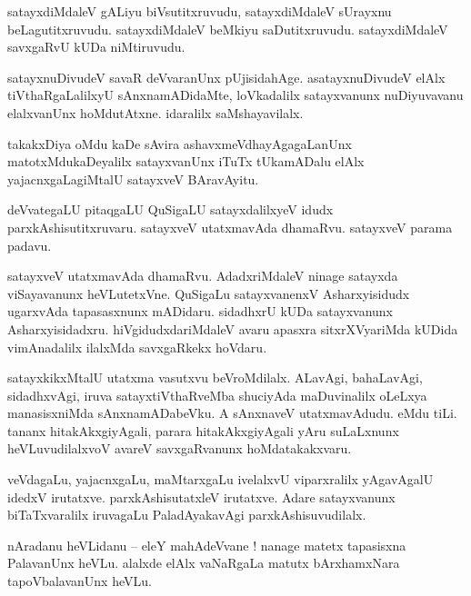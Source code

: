 \documentclass{article}
\begin{document}
\begin{mn}%
satayxdiMdaleV gALiyu biVsutitxruvudu, satayxdiMdaleV sUrayxnu beLagutitxruvudu. satayxdiMdaleV 
beMkiyu saDutitxruvudu. satayxdiMdaleV savxgaRvU kUDa niMtiruvudu.
\end{mn}

\begin{mn}%
satayxnuDivudeV savaR deVvaranUnx pUjisidahAge. asatayxnuDivudeV elAlx tiVthaRgaLalilxyU 
sAnxnamADidaMte, loVkadalilx satayxvanunx nuDiyuvavanu elalxvanUnx hoMdutAtxne. idaralilx 
saMshayavilalx.
\end{mn}

\begin{mn}%
takakxDiya oMdu kaDe sAvira ashavxmeVdhayAgagaLanUnx matotxMdukaDeyalilx satayxvanUnx iTuTx 
tUkamADalu elAlx yajacnxgaLagiMtalU satayxveV BAravAyitu.
\end{mn}

\begin{mn}%
deVvategaLU pitaqgaLU QuSigaLU satayxdalilxyeV idudx parxkAshisutitxruvaru. satayxveV utatxmavAda 
dhamaRvu. satayxveV parama padavu.
\end{mn}

\begin{mn}%
satayxveV utatxmavAda dhamaRvu. AdadxriMdaleV ninage satayxda viSayavanunx heVLutetxVne. QuSigaLu 
satayxvanenxV Asharxyisidudx ugarxvAda tapasasxnunx mADidaru. sidadhxrU kUDa satayxvanunx 
Asharxyisidadxru. hiVgidudxdariMdaleV avaru apasxra sitxrXVyariMda kUDida vimAnadalilx ilalxMda 
savxgaRkekx hoVdaru.
\end{mn}

\begin{mn}%
satayxkikxMtalU utatxma vasutxvu beVroMdilalx. ALavAgi, bahaLavAgi, sidadhxvAgi, iruva 
satayxtiVthaRveMba shuciyAda maDuvinalilx oLeLxya manasisxniMda sAnxnamADabeVku. A sAnxnaveV 
utatxmavAdudu. eMdu tiLi. tananx hitakAkxgiyAgali, parara hitakAkxgiyAgali yAru suLaLxnunx 
heVLuvudilalxvoV avareV savxgaRvanunx hoMdatakakxvaru.
\end{mn}

\begin{mn}%
veVdagaLu, yajacnxgaLu, maMtarxgaLu ivelalxvU viparxralilx yAgavAgalU idedxV irutatxve. 
parxkAshisutatxleV irutatxve. Adare satayxvanunx biTaTxvaralilx iruvagaLu PaladAyakavAgi 
parxkAshisuvudilalx.
\end{mn}

\begin{mn}%
nAradanu heVLidanu -- eleY mahAdeVvane ! nanage matetx tapasisxna PalavanUnx heVLu. alalxde  elAlx 
vaNaRgaLa matutx bArxhamxNara tapoVbalavanUnx heVLu.
\end{mn}
\end{document}
